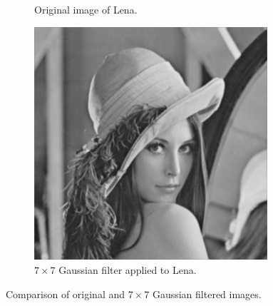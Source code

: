 \documentclass{article}
\theoremstyle{problemstyle}
\begin{document}
\begin{problem}
\begin{enumerate}[a)]
\begin{enumerate}[i)]
\begin{figure}[H]
\begin{subfigure}{.45\textwidth}
				            \caption{Original image of Lena.}
			            \end{subfigure}
			            \hfill
			            \begin{subfigure}{.45\textwidth}
				            \centering
				            \includegraphics[width=0.95\textwidth]{lena_gaussian_7x7.png}
				            \caption{$ 7\times 7 $ Gaussian filter applied to Lena.}
				            \label{fig:lena_Gaussian_7x7}
			            \end{subfigure}
			            \caption{Comparison of original and $ 7\times 7 $ Gaussian filtered images.}
		            \end{figure}
	      \end{enumerate}
\end{enumerate}
\end{problem}
\end{document}
